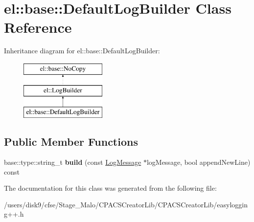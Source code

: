 \hypertarget{classel_1_1base_1_1DefaultLogBuilder}{\section{el\-:\-:base\-:\-:Default\-Log\-Builder Class Reference}
\label{classel_1_1base_1_1DefaultLogBuilder}
}
Inheritance diagram for el\-:\-:base\-:\-:Default\-Log\-Builder\-:\begin{figure}[H]
\begin{center}
\leavevmode
\includegraphics[height=3.000000cm]{classel_1_1base_1_1DefaultLogBuilder}
\end{center}
\end{figure}
\subsection*{Public Member Functions}
\begin{DoxyCompactItemize}
\item 
\hypertarget{classel_1_1base_1_1DefaultLogBuilder_aa8d2f42068115d899ed81de1b0ed360e}{base\-::type\-::string\-\_\-t {\bfseries build} (const \hyperlink{classel_1_1LogMessage}{Log\-Message} $\ast$log\-Message, bool append\-New\-Line) const }\label{classel_1_1base_1_1DefaultLogBuilder_aa8d2f42068115d899ed81de1b0ed360e}

\end{DoxyCompactItemize}


The documentation for this class was generated from the following file\-:\begin{DoxyCompactItemize}
\item 
/users/disk9/cfse/\-Stage\-\_\-\-Malo/\-C\-P\-A\-C\-S\-Creator\-Lib/\-C\-P\-A\-C\-S\-Creator\-Lib/easylogging++.\-h\end{DoxyCompactItemize}
